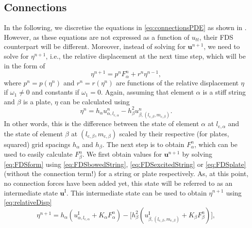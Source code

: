 \subsection{Connections}
In the following, we discretise the equations in \eqref{eq:connectionsPDE} as shown in \cite{Bilbao2009:ModularPercussion}. However, as these equations are not expressed as a function of $u_{tt}$, their FDS counterpart will be different. Moreover, instead of solving for $\mathbf{u}^{n+1}$, we need to solve for $\eta^{n+1}$, i.e., the relative displacement at the next time step, which will be in the form of
\begin{equation}\label{eq:etaNext}
    \eta^{n+1} = p^nF_\alpha^n + r^n\eta^{n-1},
\end{equation}
where $p^n = p(\eta^n)$ and $r^n = r(\eta^n)$ are functions of the relative displacement $\eta$ if $\omega_1 \neq 0$ and constants if $\omega_1 = 0$. Again, assuming that element $\alpha$ is a stiff string and $\beta$ is a plate, $\eta$ can be calculated using
\begin{equation}\label{eq:relativeDisp}
    \eta^n = h_\alpha u_{\alpha, l_{\text{c},\alpha}}^n - h_\beta^2 u_{\beta,(l_{\text{c},\beta}, m_{\text{c},\beta})}^n.
\end{equation}
In other words, this is the difference between the state of element $\alpha$ at $l_{\text{c},\alpha}$ and the state of element $\beta$ at $(l_{\text{c},\beta}, m_{\text{c},\beta})$ scaled by their respective (for plates, squared) grid spacings $h_\alpha$ and $h_\beta$. %
The next step is to obtain $F^n_\alpha$, which can be used to easily calculate $F^n_\beta$. We first obtain values for $\mathbf{u}^{n+1}$ by solving \eqref{eq:FDSform} using \eqref{eq:FDSbowedString}, \eqref{eq:FDSexcitedString} or \eqref{eq:FDSplate} (without the connection term!) for a string or plate respectively. As, at this point, no connection forces have been added yet, this state will be referred to as an intermediate state $\mathbf{u}^\text{I}$. This intermediate state can be used to obtain $\eta^{n+1}$ using \eqref{eq:relativeDisp}
\begin{equation}
    \eta^{n+1} = h_\alpha( u_{\alpha,l_{\text{c},\alpha}}^\text{I} + K_\alpha F^n_\alpha) - \Big[h^2_\beta( u_{\beta,(l_{\text{c},\beta}, m_{\text{c},\beta})}^\text{I} 
    + K_\beta F^n_\beta)\Big],
\end{equation}
